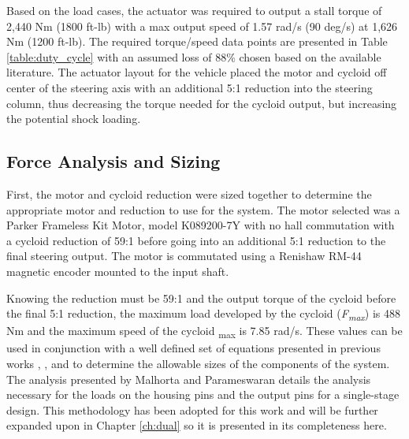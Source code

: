 Based on the load cases, the actuator was required to output a stall torque of 2,440 Nm (1800 ft-lb) with a max output speed of 1.57 rad/s (90 deg/s) at 1,626 Nm (1200 ft-lb).
The required torque/speed data points are presented in Table \ref{table:duty_cycle} with an assumed loss of 88\% chosen based on the available literature.
The actuator layout for the vehicle placed the motor and cycloid off center of the steering axis with an additional 5:1 reduction into the steering column, thus decreasing the torque needed for the cycloid output, but increasing the potential shock loading.

\subsection{Force Analysis and Sizing} \label{ch:design:single:force_analysis}

First, the motor and cycloid reduction were sized together to determine the appropriate motor and reduction to use for the system. The motor selected was a Parker Frameless Kit Motor, model K089200-7Y with no hall commutation with a cycloid reduction of 59:1 before going into an additional 5:1 reduction to the final steering output. The motor is commutated using a Renishaw RM-44 magnetic encoder mounted to the input shaft. 

Knowing the reduction must be 59:1 and the output torque of the cycloid before the final 5:1 reduction, the maximum load developed by the cycloid (\textit{F\textsubscript{max}}) is 488 Nm and the maximum speed of the cycloid {\textomega\textsubscript{max}} is 7.85 rad/s. These values can be used in conjunction with a well defined set of equations presented in previous works \cite{ref:malhorta}, \cite{ref:li}, and \cite{ref:unified_approach} to determine the allowable sizes of the components of the system. The analysis presented by Malhorta and Parameswaran details the analysis necessary for the loads on the housing pins and the output pins for a single-stage design. This methodology has been adopted for this work and will be further expanded upon in Chapter \ref{ch:dual} so it is presented in its completeness here. 

